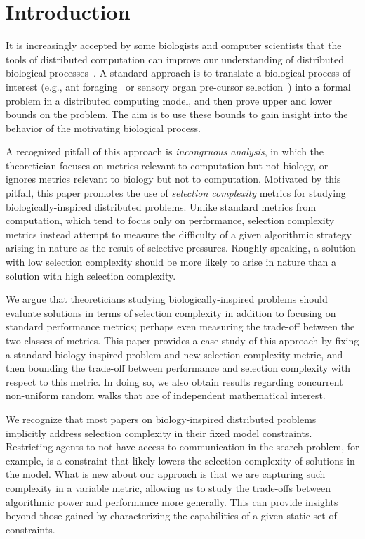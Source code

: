 \documentclass[11pt]{article}
\begin{document}
\thispagestyle{empty}
\setcounter{page}{0}

\pagebreak


\section{Introduction}
\label{sec:intro}


It is increasingly accepted by some biologists and computer scientists that the tools of distributed computation can improve our understanding of distributed biological processes~\cite{feinerman12disc, feinerman13, feinerman12podc}. A standard approach is to translate a biological process of interest (e.g., ant foraging~\cite{feinerman12disc, feinerman12podc} or sensory organ pre-cursor selection~\cite{afek11}) into a formal problem in a distributed computing model, and then prove upper and lower bounds on the problem. The aim is to use these bounds to gain insight into the behavior of the motivating biological process.

A recognized pitfall of this approach is \emph{incongruous analysis}, in which the theoretician focuses on metrics relevant to computation but not biology, or ignores metrics relevant to biology but not to computation.  Motivated by this pitfall, this paper promotes the use of {\em selection complexity} metrics for studying biologically-inspired distributed problems. Unlike standard metrics from computation, which tend to focus only on performance, selection complexity metrics instead attempt to measure the difficulty of a given algorithmic strategy arising in nature as the result of selective pressures. Roughly speaking, a solution with low selection complexity should be more likely to arise in nature than a solution with high selection complexity.

We argue that theoreticians studying biologically-inspired problems should evaluate solutions in terms of selection complexity in addition to focusing on standard performance metrics; perhaps even measuring the trade-off between the two classes of metrics. This paper provides a case study of this approach by fixing a standard biology-inspired problem and new selection complexity metric, and then bounding the trade-off between performance and selection complexity with respect to this metric. In doing so, we also obtain results regarding concurrent non-uniform random walks that are of independent mathematical interest.

We recognize that most papers on biology-inspired distributed problems implicitly address selection complexity in their fixed model constraints. Restricting agents to not have access to communication in the search problem, for example, is a constraint that likely lowers the selection complexity of solutions in the model. What is new about our approach is that we are capturing such complexity in a variable metric, allowing us to study the trade-offs between algorithmic power and performance more generally. This can provide insights beyond those gained by characterizing the capabilities of a given static set of constraints.
\end{document}

